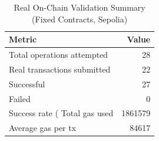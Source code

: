 \begin{table}[h]
\caption{Real On-Chain Validation Summary (Fixed Contracts, Sepolia)}
\label{tab:onchain_validation}
\centering
\begin{tabular}{lr}
\hline
\textbf{Metric} & \textbf{Value} \\
\hline
Total operations attempted & 28 \\
Real transactions submitted & 22 \\
Successful & 27 \\
Failed & 0 \\
Success rate (%
Total gas used & 1861579 \\
Average gas per tx & 84617 \\
\hline
\end{tabular}
\end{table}
